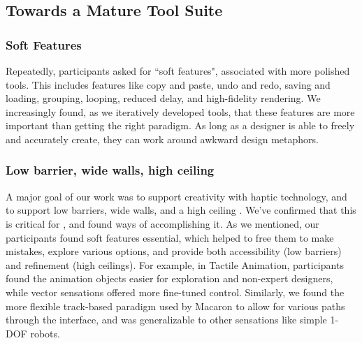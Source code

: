 %
%
\subsection{Towards a Mature \haxd Tool Suite}
\label{sec:conclusion:maturetoolsuite}



\subsubsection{Soft Features}
Repeatedly, participants asked for ``soft features", associated with more polished tools.
This includes features like copy and paste, undo and redo, saving and loading, grouping, looping, reduced delay, and high-fidelity rendering.
We increasingly found, as we iteratively developed \haxd tools, that these features are more important than getting the right paradigm.
As long as a designer is able to freely and accurately create, they can work around awkward design metaphors.

\subsubsection{Low barrier, wide walls, high ceiling}
A major goal of our work was to support creativity with haptic technology, and to support low barriers, wide walls, and a high ceiling \cite{Shneiderman2007,Resnick2008}.
We've confirmed that this is critical for \haxd, and found ways of accomplishing it.
As we mentioned, our participants found soft features essential, which helped to free them to make mistakes, explore various options, and provide both accessibility (low barriers) and refinement (high ceilings).
For example, in Tactile Animation, participants found the animation objects easier for exploration and non-expert designers, while vector sensations offered more fine-tuned control.
Similarly, we found the more flexible track-based paradigm used by Macaron to allow for various paths through the interface, and was generalizable to other sensations like simple 1-DOF robots.


%
%


